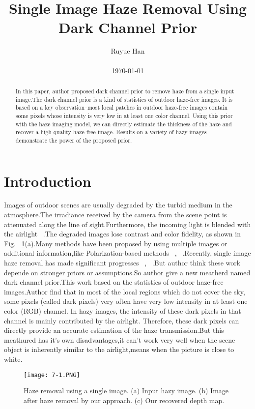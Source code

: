 \documentclass[10pt,twocolumn,letterpaper]{article}
\begin{document}
\title{Single Image Haze Removal Using Dark Channel Prior}

\author{Ruyue Han\\\\ \today}

\maketitle

\begin{abstract}
   In this paper, author proposed dark channel prior to remove haze from a single input image.The dark channel prior is a kind of statistics of outdoor haze-free images. It is based on a key observation--most local patches in outdoor haze-free images contain some pixels whose intensity is very low in at least one color channel. Using this prior with the haze imaging model, we can directly estimate the thickness of the haze and recover a high-quality haze-free image. Results on a variety of hazy images demonstrate the power of the proposed prior.
\end{abstract}
\section{Introduction}
Images of outdoor scenes are usually degraded by the turbid medium in the atmosphere.The irradiance received by the camera from the scene point is attenuated along the line of sight.Furthermore, the incoming light is blended with the airlight ~\cite{Theorie1924_1}.The degraded images lose contrast and color fidelity, as shown in Fig. ~\ref{fig:firstpicture}(a).Many methods have been proposed by using multiple images or additional information,like Polarization-based methods ~\cite{Dehazing2001_2}, ~\cite{Blind2006_3}.Recently, single image haze removal has made significant progresses ~\cite{Single2008_4}, ~\cite{Visibility2008_5}.But author think these work depende on stronger priors or assumptions.So author give a new meatherd named dark channel prior.This work based on the statistics of outdoor haze-free images.Author find that in most of the local regions which do not cover the sky, some pixels (called dark pixels) very often have very low intensity in at least one color (RGB) channel. In hazy images,
the intensity of these dark pixels in that channel is mainly contributed by the airlight. Therefore, these dark pixels can directly provide an accurate estimation of the haze transmission.But this meathured has it's own disadvantages,it can't work very well when the scene object is inherently similar to the airlight,means when the picture is close to white.
\begin{figure}[htb]
\centering
\texttt{[image: 7-1.PNG]}
\caption{Haze removal using a single image. (a) Input hazy image. (b) Image after haze removal by our approach. (c) Our recovered depth map.}
\label{fig:firstpicture}
\end{figure}
\end{document}
